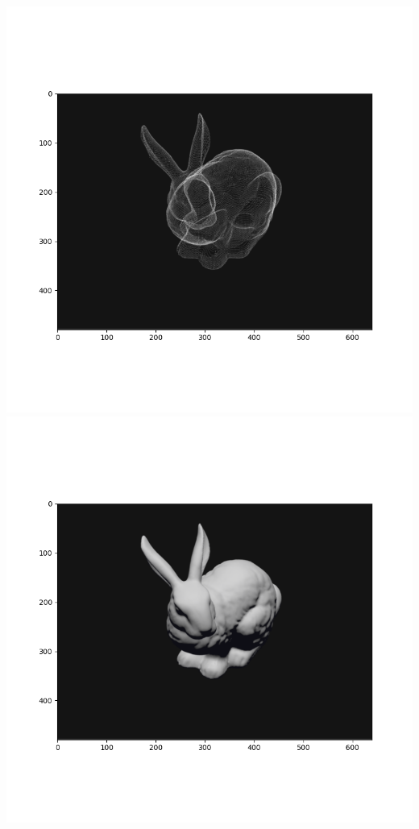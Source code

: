 \documentclass[11pt]{article}
\begin{document}
\begin{center}
    \small
    \includegraphics[width=0.37\linewidth]{fig/bunny_after_render.png}
    \includegraphics[width=0.37\linewidth]{fig/render_stanford_final.png}
\end{center}
\end{document}
